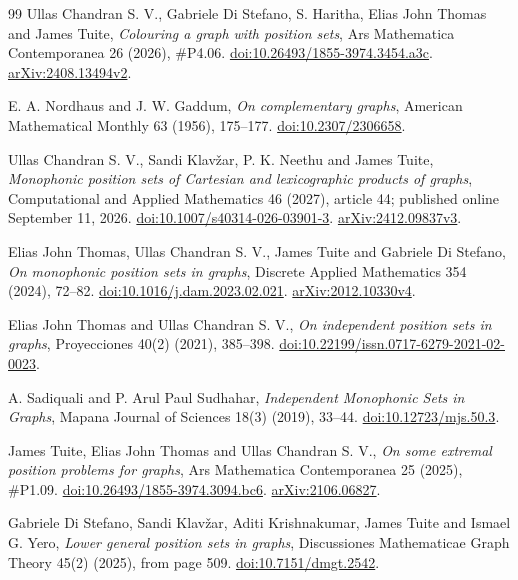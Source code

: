 \documentclass[11pt]{article}
\theoremstyle{remark}
\begin{document}
\begin{thebibliography}{99}
Ullas Chandran S. V., Gabriele Di Stefano, S. Haritha, Elias John Thomas
and James Tuite, \emph{Colouring a graph with position sets},
Ars Mathematica Contemporanea 26 (2026), \#P4.06.
\href{https://doi.org/10.26493/1855-3974.3454.a3c}{doi:10.26493/1855-3974.3454.a3c}.
\href{https://arxiv.org/abs/2408.13494v2}{arXiv:2408.13494v2}.

E. A. Nordhaus and J. W. Gaddum, \emph{On complementary graphs},
American Mathematical Monthly 63 (1956), 175--177.
\href{https://doi.org/10.2307/2306658}{doi:10.2307/2306658}.

Ullas Chandran S. V., Sandi Klav\v{z}ar, P. K. Neethu and James Tuite,
\emph{Monophonic position sets of Cartesian and lexicographic products
of graphs}, Computational and Applied Mathematics 46 (2027), article 44;
published online September 11, 2026.
\href{https://doi.org/10.1007/s40314-026-03901-3}{doi:10.1007/s40314-026-03901-3}.
\href{https://arxiv.org/abs/2412.09837v3}{arXiv:2412.09837v3}.

Elias John Thomas, Ullas Chandran S. V., James Tuite and Gabriele Di
Stefano, \emph{On monophonic position sets in graphs}, Discrete Applied
Mathematics 354 (2024), 72--82.
\href{https://doi.org/10.1016/j.dam.2023.02.021}{doi:10.1016/j.dam.2023.02.021}.
\href{https://arxiv.org/abs/2012.10330v4}{arXiv:2012.10330v4}.

Elias John Thomas and Ullas Chandran S. V., \emph{On independent position
sets in graphs}, Proyecciones 40(2) (2021), 385--398.
\href{https://doi.org/10.22199/issn.0717-6279-2021-02-0023}{doi:10.22199/issn.0717-6279-2021-02-0023}.

A. Sadiquali and P. Arul Paul Sudhahar, \emph{Independent Monophonic Sets
in Graphs}, Mapana Journal of Sciences 18(3) (2019), 33--44.
\href{https://doi.org/10.12723/mjs.50.3}{doi:10.12723/mjs.50.3}.

James Tuite, Elias John Thomas and Ullas Chandran S. V.,
\emph{On some extremal position problems for graphs}, Ars Mathematica
Contemporanea 25 (2025), \#P1.09.
\href{https://doi.org/10.26493/1855-3974.3094.bc6}{doi:10.26493/1855-3974.3094.bc6}.
\href{https://arxiv.org/abs/2106.06827}{arXiv:2106.06827}.

Gabriele Di Stefano, Sandi Klav\v{z}ar, Aditi Krishnakumar, James Tuite
and Ismael G. Yero, \emph{Lower general position sets in graphs},
Discussiones Mathematicae Graph Theory 45(2) (2025), from page 509.
\href{https://doi.org/10.7151/dmgt.2542}{doi:10.7151/dmgt.2542}.


\end{thebibliography}
\end{document}
